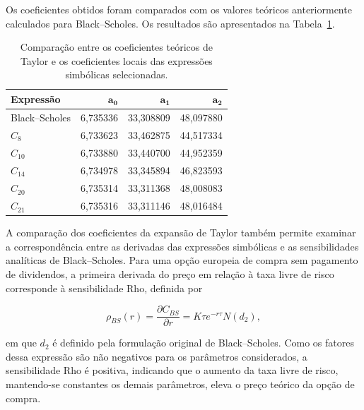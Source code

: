 Os coeficientes obtidos foram comparados com os
valores teóricos anteriormente calculados para
Black--Scholes. Os resultados são apresentados
na Tabela~\ref{tab:r_coeficientes}.

\begin{table}[htbp]
\centering
\caption{Comparação entre os coeficientes teóricos
de Taylor e os coeficientes locais das expressões
simbólicas selecionadas.}
\label{tab:r_coeficientes}
\small
\setlength{\tabcolsep}{7pt}

\begin{tabular}{l r r r}
\hline
\textbf{Expressão} &
$\boldsymbol{a_0}$ &
$\boldsymbol{a_1}$ &
$\boldsymbol{a_2}$ \\
\hline

Black--Scholes &
6,735336 &
33,308809 &
48,097880 \\

$\widehat{C}_8$ &
6,733623 &
33,462875 &
44,517334 \\

$\widehat{C}_{10}$ &
6,733880 &
33,440700 &
44,952359 \\

$\widehat{C}_{14}$ &
6,734978 &
33,345894 &
46,823593 \\

$\widehat{C}_{20}$ &
6,735314 &
33,311368 &
48,008083 \\

$\widehat{C}_{21}$ &
6,735316 &
33,311146 &
48,016484 \\

\hline
\end{tabular}
\end{table}

A comparação dos coeficientes da expansão de Taylor também permite examinar a correspondência entre as derivadas das expressões simbólicas e as sensibilidades analíticas de Black--Scholes. Para uma opção europeia de compra sem pagamento de dividendos, a primeira derivada do preço em relação à taxa livre de risco corresponde à sensibilidade Rho, definida por

\begin{equation}
\label{eq:rho_bs}
\rho_{BS}(r)=
\frac{\partial C_{BS}}{\partial r}
=
K\tau e^{-r\tau}N(d_2),
\end{equation}

em que $d_2$ é definido pela formulação original de Black--Scholes. Como os fatores dessa expressão são não negativos para os parâmetros considerados, a sensibilidade Rho é positiva, indicando que o aumento da taxa livre de risco, mantendo-se constantes os demais parâmetros, eleva o preço teórico da opção de compra.

